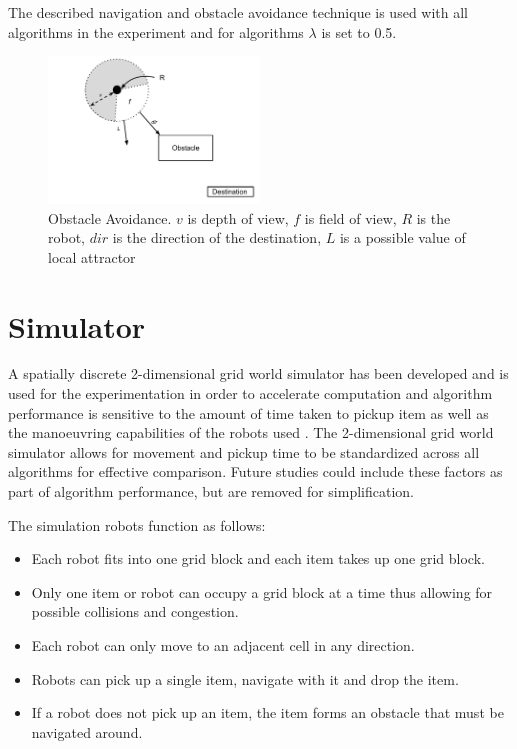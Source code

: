 The described navigation and obstacle avoidance technique is used with all algorithms in the experiment and for algorithms $\lambda$ is set to 0.5.

\begin{figure}
	\centering
	\includegraphics[width=0.5\textwidth]{chapters/chapter5/figures/ObstacleAvoidance.pdf}
	\caption{Obstacle Avoidance. $v$ is depth of view, $f$ is field of view, $R$ is the robot, $dir$ is the direction of the destination, $L$ is a possible value of local attractor}
	\label{fig:obstacleavoidance}
\end{figure}


\section{Simulator}
\label{simulator}
A spatially discrete 2-dimensional grid world simulator has been developed and is used for the experimentation in order to accelerate computation \cite{sugawara2002swarming} and algorithm performance is sensitive to the amount of time taken to pickup item as well as the manoeuvring capabilities of the robots used \cite{ostergaard2001emergent}. The 2-dimensional grid world simulator allows for movement and pickup time to be standardized across all algorithms for effective comparison. Future studies could include these factors as part of algorithm performance, but are removed for simplification. 

The simulation robots function as follows:
\begin{itemize}
	\item Each robot fits into one grid block and each item takes up one grid block. 
	\item Only one item or robot can occupy a grid block at a time thus allowing for possible collisions and congestion. 
	\item Each robot can only move to an adjacent cell in any direction.
	\item Robots can pick up a single item, navigate with it and drop the item.
	\item If a robot does not pick up an item, the item forms an obstacle that must be navigated around.
\end{itemize}

